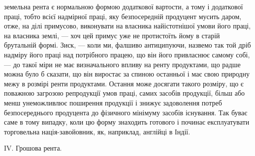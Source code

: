 \parcont{}  %
земельна рента є нормальною формою додаткової вартости, а тому і додаткової
праці, тобто всієї надмірної праці, яку безпосередній продуцент мусить даром,
отже, на ділі примусово, виконувати на власника найістотнішої умови його
праці, на власника землі, — хоч цей примус уже не протистоїть йому в старій
брутальній формі. Зиск, — коли ми, фалшиво антиципуючи, назвемо так той
дріб надміру його праці над потрібного працею, що він його привласнює самому
собі, — до такої міри не має визначального впливу на ренту продуктами, що
радше можна було б сказати, що він виростає за спиною останньої і має свою
природну межу в розмірі ренти продуктами. Остання може досягати такого
розміру, що є поважною загрозою репродукції умов праці, самих засобів продукції,
більш або менш унеможливлює поширення продукції і знижує задоволення
потреб безпосереднього продуцента до фізичного мінімуму засобів
існування. Так буває саме в тому випадку, коли цю форму знаходить готового
і починає експлуатувати торговельна нація-завойовник, як, наприклад, англійці
в Індії.

IV. Грошова рента.

